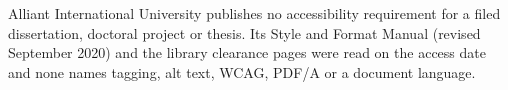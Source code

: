 	{Alliant International University publishes no accessibility requirement for
	 a filed dissertation, doctoral project or thesis. Its Style and Format
	 Manual (revised September 2020) and the library clearance pages were read
	 on the access date and none names tagging, alt text, WCAG, PDF/A or a
	 document language.}

%
%
\providecommand{\thesisschool}{School Name}
\providecommand{\thesiscampus}{Campus}

